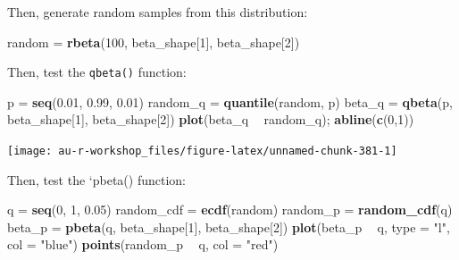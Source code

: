 \documentclass[]{book}
\newenvironment{Shaded}{\begin{snugshade}}{\end{snugshade}}
\newcommand{\DataTypeTok}[1]{\textcolor[rgb]{0.13,0.29,0.53}{#1}}
\newcommand{\DecValTok}[1]{\textcolor[rgb]{0.00,0.00,0.81}{#1}}
\newcommand{\FloatTok}[1]{\textcolor[rgb]{0.00,0.00,0.81}{#1}}
\newcommand{\KeywordTok}[1]{\textcolor[rgb]{0.13,0.29,0.53}{\textbf{#1}}}
\newcommand{\NormalTok}[1]{#1}
\newcommand{\OperatorTok}[1]{\textcolor[rgb]{0.81,0.36,0.00}{\textbf{#1}}}
\newcommand{\StringTok}[1]{\textcolor[rgb]{0.31,0.60,0.02}{#1}}
\begin{document}
Then, generate random samples from this distribution:

\begin{Shaded}
\begin{Highlighting}[]
\NormalTok{random =}\StringTok{ }\KeywordTok{rbeta}\NormalTok{(}\DecValTok{100}\NormalTok{, beta_shape[}\DecValTok{1}\NormalTok{], beta_shape[}\DecValTok{2}\NormalTok{])}
\end{Highlighting}
\end{Shaded}

Then, test the \texttt{qbeta()} function:

\begin{Shaded}
\begin{Highlighting}[]
\NormalTok{p =}\StringTok{ }\KeywordTok{seq}\NormalTok{(}\FloatTok{0.01}\NormalTok{, }\FloatTok{0.99}\NormalTok{, }\FloatTok{0.01}\NormalTok{)}
\NormalTok{random_q =}\StringTok{ }\KeywordTok{quantile}\NormalTok{(random, p)}
\NormalTok{beta_q =}\StringTok{ }\KeywordTok{qbeta}\NormalTok{(p, beta_shape[}\DecValTok{1}\NormalTok{], beta_shape[}\DecValTok{2}\NormalTok{])}
\KeywordTok{plot}\NormalTok{(beta_q }\OperatorTok{~}\StringTok{ }\NormalTok{random_q); }\KeywordTok{abline}\NormalTok{(}\KeywordTok{c}\NormalTok{(}\DecValTok{0}\NormalTok{,}\DecValTok{1}\NormalTok{))}
\end{Highlighting}
\end{Shaded}

\begin{center}\texttt{[image: au-r-workshop\_files/figure-latex/unnamed-chunk-381-1]} \end{center}

Then, test the `pbeta() function:

\begin{Shaded}
\begin{Highlighting}[]
\NormalTok{q =}\StringTok{ }\KeywordTok{seq}\NormalTok{(}\DecValTok{0}\NormalTok{, }\DecValTok{1}\NormalTok{, }\FloatTok{0.05}\NormalTok{)}
\NormalTok{random_cdf =}\StringTok{ }\KeywordTok{ecdf}\NormalTok{(random)}
\NormalTok{random_p =}\StringTok{ }\KeywordTok{random_cdf}\NormalTok{(q)}
\NormalTok{beta_p =}\StringTok{ }\KeywordTok{pbeta}\NormalTok{(q, beta_shape[}\DecValTok{1}\NormalTok{], beta_shape[}\DecValTok{2}\NormalTok{])}
\KeywordTok{plot}\NormalTok{(beta_p }\OperatorTok{~}\StringTok{ }\NormalTok{q, }\DataTypeTok{type =} \StringTok{"l"}\NormalTok{, }\DataTypeTok{col =} \StringTok{"blue"}\NormalTok{)}
\KeywordTok{points}\NormalTok{(random_p }\OperatorTok{~}\StringTok{ }\NormalTok{q, }\DataTypeTok{col =} \StringTok{"red"}\NormalTok{)}
\end{Highlighting}
\end{Shaded}
\end{document}
